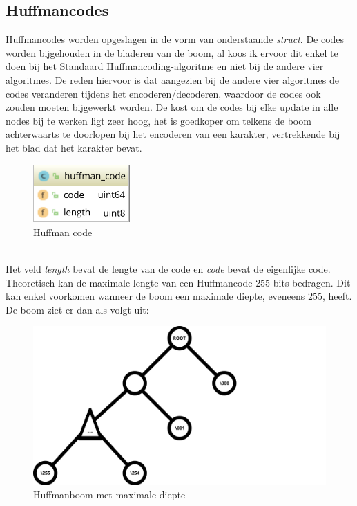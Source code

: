 \subsection{Huffmancodes}
Huffmancodes worden opgeslagen in de vorm van onderstaande \emph{struct}. De codes worden bijgehouden in de bladeren van de boom, al koos ik ervoor dit enkel te doen bij het Standaard Huffmancoding-algoritme en niet bij de andere vier algoritmes. De reden hiervoor is dat aangezien bij de andere vier algoritmes de codes veranderen tijdens het encoderen/decoderen, waardoor de codes ook zouden moeten bijgewerkt worden. De kost om de codes bij elke update in alle nodes bij te werken ligt zeer hoog, het is goedkoper om telkens de boom achterwaarts te doorlopen bij het encoderen van een karakter, vertrekkende bij het blad dat het karakter bevat.
\begin{figure}[h]
	\centering
	\includegraphics[width=10em]{resources/huffman-code.png}
	\caption{Huffman code}
\end{figure}
\\Het veld \emph{length} bevat de lengte van de code en \emph{code} bevat de eigenlijke code. Theoretisch kan de maximale lengte van een Huffmancode $255$ bits bedragen. Dit kan enkel voorkomen wanneer de boom een maximale diepte, eveneens $255$, heeft. De boom ziet er dan als volgt uit:
\newpage
\begin{figure}[h]
	\centering
	\includegraphics[width=\linewidth]{resources/huffman-boom-maxpath.png}
	\caption{Huffmanboom met maximale diepte}
\end{figure}
